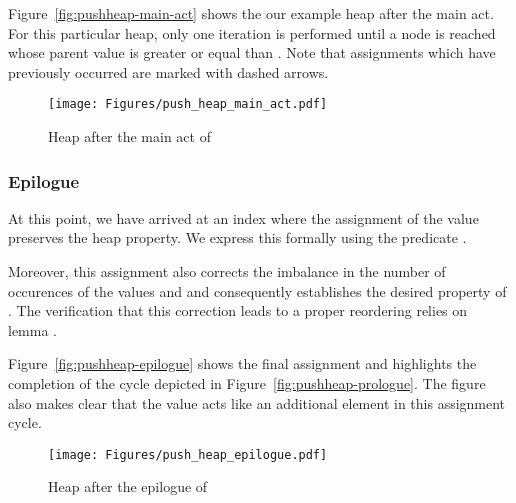 Figure~\ref{fig:pushheap-main-act} shows the our example heap after the main act.
For this particular heap, only one iteration is performed until a node is reached
whose parent value  is greater or equal than .
Note that assignments which have previously occurred are marked with dashed arrows. 

\begin{figure}[hbt]
\centering
\texttt{[image: Figures/push\_heap\_main\_act.pdf]}
\caption{Heap after the main act of \pushheap}
\end{figure}

\FloatBarrier
\clearpage

\subsubsection{Epilogue}

At this point, we have arrived at an index  where 
the assignment of the value  preserves the heap property.
We express this formally using the predicate .

Moreover, this assignment also corrects the imbalance in the number of
occurences of the values  and  and consequently
establishes the desired property  of \pushheap.
The verification that this correction leads to a proper reordering relies
on lemma .

Figure~\ref{fig:pushheap-epilogue} shows the final assignment and highlights the
completion of the cycle depicted in Figure~\ref{fig:pushheap-prologue}.
The figure also makes clear that the value  acts like an additional
element in this assignment cycle.

\begin{figure}[hbt]
\centering
\texttt{[image: Figures/push\_heap\_epilogue.pdf]}
\caption{Heap after the epilogue of \pushheap}
\end{figure}

\clearpage

